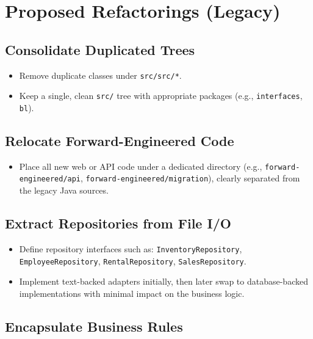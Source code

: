 \section{Proposed Refactorings (Legacy)}

\subsection*{Consolidate Duplicated Trees}

\begin{itemize}[leftmargin=1.2cm]
  \item Remove duplicate classes under \texttt{src/src/*}.
  \item Keep a single, clean \texttt{src/} tree with appropriate
        packages (e.g., \texttt{interfaces}, \texttt{bl}).
\end{itemize}

\subsection*{Relocate Forward-Engineered Code}

\begin{itemize}[leftmargin=1.2cm]
  \item Place all new web or API code under a dedicated directory
        (e.g., \texttt{forward-engineered/api},
        \texttt{forward-engineered/migration}), clearly separated from
        the legacy Java sources.
\end{itemize}

\subsection*{Extract Repositories from File I/O}

\begin{itemize}[leftmargin=1.2cm]
  \item Define repository interfaces such as:
        \texttt{InventoryRepository}, \texttt{EmployeeRepository},
        \texttt{RentalRepository}, \texttt{SalesRepository}.
  \item Implement text-backed adapters initially, then later swap to
        database-backed implementations with minimal impact on the
        business logic.
\end{itemize}

\subsection*{Encapsulate Business Rules}

